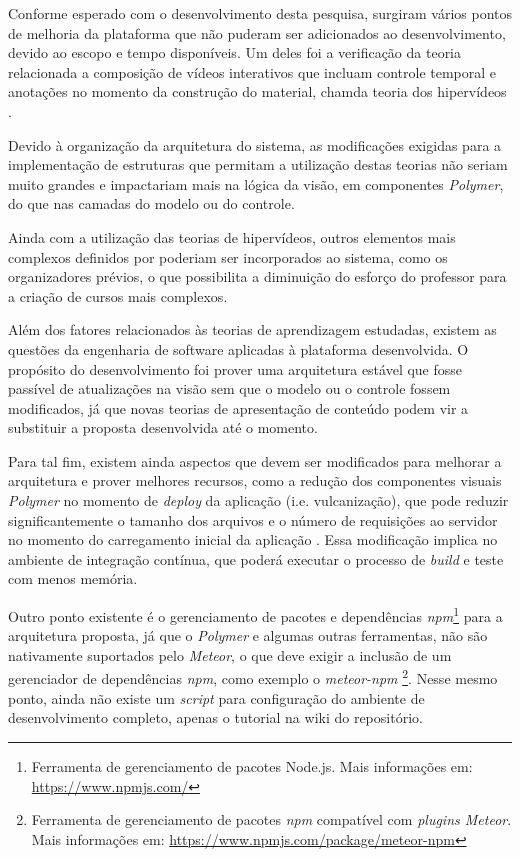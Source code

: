 Conforme esperado com o desenvolvimento desta pesquisa, surgiram vários pontos de melhoria da plataforma que não puderam ser adicionados ao desenvolvimento, devido ao escopo e tempo disponíveis. Um deles foi a verificação da teoria relacionada a composição de vídeos interativos que incluam controle temporal e anotações no momento da construção do material, chamda teoria dos hipervídeos \cite{Sadallah2012}. 

Devido à organização da arquitetura do sistema, as modificações exigidas para a implementação de estruturas que permitam a utilização destas teorias não seriam muito grandes e impactariam mais na lógica da visão, em componentes \textit{Polymer}, do que nas camadas do modelo ou do controle.

Ainda com a utilização das teorias de hipervídeos, outros elementos mais complexos definidos por  poderiam ser incorporados ao sistema, como os organizadores prévios, o que possibilita a diminuição do esforço do professor para a criação de cursos mais complexos.

Além dos fatores relacionados às teorias de aprendizagem estudadas, existem as questões da engenharia de software aplicadas à plataforma desenvolvida. O propósito do desenvolvimento foi prover uma arquitetura estável que fosse passível de atualizações na visão sem que o modelo ou o controle fossem modificados, já que novas teorias de apresentação de conteúdo podem vir a substituir a proposta desenvolvida até o momento.

Para tal fim, existem ainda aspectos que devem ser modificados para melhorar a arquitetura e prover melhores recursos, como a redução dos componentes visuais \textit{Polymer} no momento de \textit{deploy} da aplicação (i.e. vulcanização), que pode reduzir significantemente o tamanho dos arquivos e o número de requisições ao servidor no momento do carregamento inicial da aplicação \cite{vulcanize2013}. Essa modificação implica no ambiente de integração contínua, que poderá executar o processo de \textit{build} e teste com menos memória.

Outro ponto existente é o gerenciamento de pacotes e dependências \textit{npm}\footnote{Ferramenta de gerenciamento de pacotes Node.js. Mais informações em: \url{https://www.npmjs.com/}} para a arquitetura proposta, já que o \textit{Polymer} e algumas outras ferramentas, não são nativamente suportados pelo \textit{Meteor}, o que deve exigir a inclusão de um gerenciador de dependências \textit{npm}, como exemplo o \textit{meteor-npm} \footnote{Ferramenta de gerenciamento de pacotes \textit{npm} compatível com \textit{plugins Meteor}. Mais informações em: \url{https://www.npmjs.com/package/meteor-npm}}. Nesse mesmo ponto, ainda não existe um \textit{script} para configuração do ambiente de desenvolvimento completo, apenas o tutorial na wiki do repositório. 

